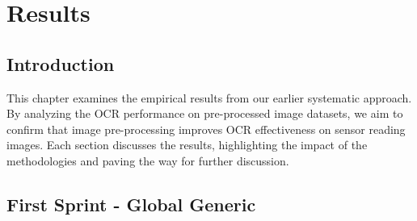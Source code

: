 \chapter{Results}
\label{chap:results}

\section{Introduction}


This chapter examines the empirical results from our earlier systematic approach. By analyzing the OCR performance on pre-processed image datasets, we aim to confirm that image pre-processing improves OCR effectiveness on sensor reading images. Each section discusses the results, highlighting the impact of the methodologies and paving the way for further discussion.

\section{First Sprint - Global Generic}


